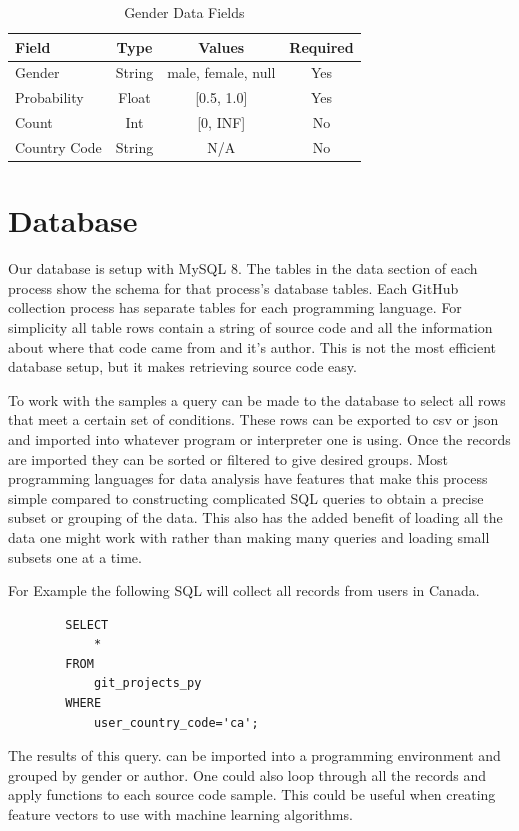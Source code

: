\documentclass{article}
\begin{document}
\begin{table}[t]
    \begin{center}
        \caption{Gender Data Fields}
        \label{tab:gen_data}
        \begin{tabular}{| l |c | c | c |}
            \hline
            \textbf{Field} & \textbf{Type} & \textbf{Values} & \textbf{Required}\\
            \hline
            Gender & String & {male, female, null} & Yes\\
            Probability & Float & [0.5, 1.0] & Yes\\ 
            Count & Int & [0, INF] & No\\
            Country Code & String & N/A & No\\
            \hline
        \end{tabular}
    \end{center}
\end{table}


\section{Database}

Our database is setup with MySQL 8. The tables in the data section of each process show the schema for that process's database tables. Each GitHub collection process has separate tables for each programming language. For simplicity all table rows contain a string of source code and all the information about where that code came from and it's author. This is not the most efficient database setup, but it makes retrieving source code easy.

To work with the samples a query can be made to the database to select all rows that meet a certain set of conditions. These rows can be exported to csv or json and imported into whatever program or interpreter one is using. Once the records are imported they can be sorted or filtered to give desired groups. Most programming languages for data analysis have features that make this process simple compared to constructing complicated SQL queries to obtain a precise subset or grouping of the data. This also has the added benefit of loading all the data one might work with rather than making many queries and loading small subsets one at a time.

For Example the following SQL will collect all records from users in Canada.
    \begin{verbatim}
        SELECT
            *
        FROM
            git_projects_py
        WHERE
            user_country_code='ca';
    \end{verbatim}
The results of this query. can be imported into a programming environment and grouped by gender or author. One could also loop through all the records and apply functions to each source code sample. This could be useful when creating feature vectors to use with machine learning algorithms.
\end{document}
